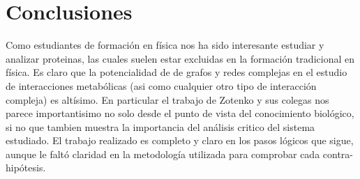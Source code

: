 \section{Conclusiones}

Como estudiantes de formaci\'on en f\'isica nos ha sido interesante estudiar y analizar proteinas, las cuales suelen estar 
excluidas en la formaci\'on tradicional en f\'isica. Es claro que la potencialidad de de grafos y redes complejas en el estudio de
interacciones metab\'olicas (asi como cualquier otro tipo de interacci\'on compleja) es alt\'isimo.
En particular el trabajo de Zotenko y sus colegas nos parece importantisimo no solo desde el punto de vista del conocimiento
biol\'ogico, si no que tambien muestra la importancia del an\'alisis critico del sistema estudiado. El trabajo realizado es 
completo y claro en los pasos l\'ogicos que sigue, aunque le falt\'o claridad en la metodolog\'ia utilizada para comprobar cada contra-hip\'otesis. 

